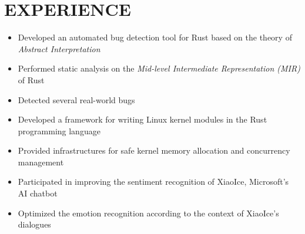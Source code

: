 \documentclass[11pt,a4paper,roman]{moderncv} %
\begin{document}


\section{EXPERIENCE}

{
	\begin{itemize}
		\item Developed an automated bug detection tool for Rust based on the theory of \textit{Abstract Interpretation}
		\item Performed static analysis on the \textit{Mid-level Intermediate Representation (MIR)} of Rust
		\item Detected several real-world bugs
	\end{itemize}
}

{
	\begin{itemize}
		\item Developed a framework for writing Linux kernel modules in the Rust programming language
		\item Provided infrastructures for safe kernel memory allocation and concurrency management
	\end{itemize}
}

{
    \begin{itemize}
    	\item Participated in improving the sentiment recognition of XiaoIce, Microsoft's AI chatbot
	\item Optimized the emotion recognition according to the context of XiaoIce's dialogues
	\end{itemize}
}
\end{document}
